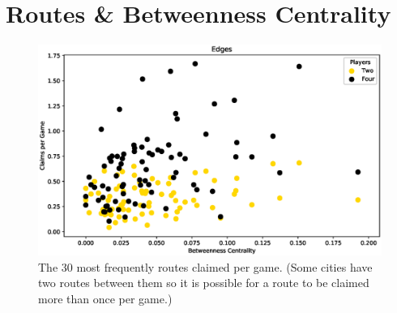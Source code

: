 \newpage
\section{Routes \& Betweenness Centrality}

\begin{figure}[!ht]
\centering
\includegraphics[scale=.7]{figures/centrality_betweenness}
\caption{The 30 most frequently routes claimed
per game.
(Some cities have two routes between them so it is
possible for a route to be claimed more than once per game.)}
\label{fig:routes}
\end{figure}